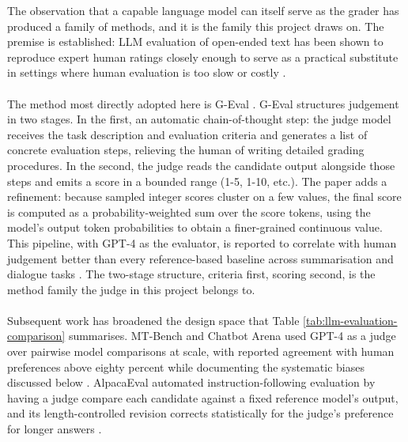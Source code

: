 The observation that a capable language model can itself serve as the grader has produced a family of methods, and it is the family this project draws on. The premise is established: LLM evaluation of open-ended text has been shown to reproduce expert human ratings closely enough to serve as a practical substitute in settings where human evaluation is too slow or costly \cite{chiang2023llmalternative}. 
\\\\
The method most directly adopted here is G-Eval \cite{liu2023geval}. G-Eval structures judgement in two stages. In the first, an automatic chain-of-thought step: the judge model receives the task description and evaluation criteria and generates a list of concrete evaluation steps, relieving the human of writing detailed grading procedures. In the second, the judge reads the candidate output alongside those steps and emits a score in a bounded range (1-5, 1-10, etc.). The paper adds a refinement: because sampled integer scores cluster on a few values, the final score is computed as a probability-weighted sum over the score tokens, using the model's output token probabilities to obtain a finer-grained continuous value. This pipeline, with GPT-4 as the evaluator, is reported to correlate with human judgement better than every reference-based baseline across summarisation and dialogue tasks \cite{liu2023geval}. The two-stage structure, criteria first, scoring second, is the method family the judge in this project belongs to.
\\\\
Subsequent work has broadened the design space that Table \ref{tab:llm-evaluation-comparison} summarises. MT-Bench and Chatbot Arena used GPT-4 as a judge over pairwise model comparisons at scale, with reported agreement with human preferences above eighty percent while documenting the systematic biases discussed below \cite{zheng2023mtbench}. AlpacaEval automated instruction-following evaluation by having a judge compare each candidate against a fixed reference model's output, and its length-controlled revision corrects statistically for the judge's preference for longer answers \cite{li2023alpacaeval}\cite{dubois2024lengthcontrolled}. 
\\\\

